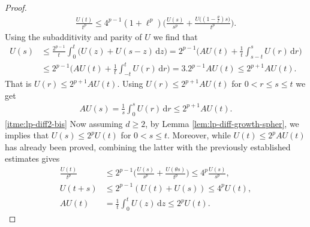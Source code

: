 \documentclass[12pt, reqno]{amsart}%
\theoremstyle{plain}  %
\theoremstyle{definition}  %
\theoremstyle{remark}
\numberwithin{equation}{section}
\renewcommand{\d}{\,\mathrm{d}}
\begin{document}
\begin{proof}
\begin{align*}
\frac{U(t)}{t^p}\leq 4^{p-1}(1+\ell^p)\Big(\frac{U(s)}{s^p}+  \frac{U\big((1-\tfrac{\theta }{\ell})s\big) }{t^p}\Big).
\end{align*}
Using the subadditivity and parity of $U$ we find that
\begin{align*}
 U(s)
&\leq \frac{2^{p-1}}{t} \int_0^t\big(U(z) +  U(s-z)\d z \big)= 2^{p-1}\big( AU(t)+ \frac{1}{t} \int^s_{s-t} U(r)\d r\big)\\
&\leq  2^{p-1}\big( AU(t)+ \frac{1}{t} \int^t_{-t} U(r)\d r\big)= 3.2^{p-1}AU(t)\leq 2^{p+1}AU(t).
\end{align*}
That is $U(r)\leq 2^{p+1} AU(t)$. Using $U(r)\leq 2^{p+1} AU(t)$ for $0<r\leq s\leq  t$ we get
\begin{align*}
AU(s)= \frac{1}{s}\int_0^s U(r)\d r \leq 2^{p+1}AU(t).
\end{align*}
\eqref{itme:lp-diff2-bis} Now assuming $d\geq 2$, by  Lemma \ref{lem:lp-diff-growth-spher}, we implies that  $U(s)\leq 2^p U(t)$ for $0<s\leq t$. Moreover, while $U(t)\leq 2^{p} AU(t)$has already been proved, combining the latter with the previously established estimates gives
\begin{align*}
\frac{U(t)}{t^p}&\leq  2^{p-1}\Big(\frac{U(s)}{s^p}+ \frac{U(\theta s)}{t^p}\Big)\leq 4^{p}\frac{U(s)}{s^p},\\
U(t+s)&\leq 2^{p-1}(U(t)+U(s))\leq 4^p U(t),\\
AU(t)&= \frac{1}{t}\int_0^t U(z)\d z \leq 2^p U(t).
\end{align*}


\end{proof}
\end{document}

